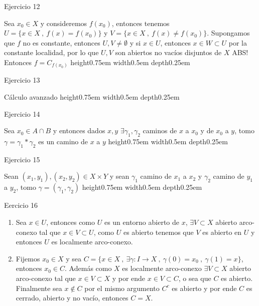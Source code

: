 \documentclass[11pt]{article}
\newcommand{\sette}[2]{\{#1 \ , \ #2 \}}
\newenvironment{proof}[1][Demostraci\'on]{\begin{trivlist}
\item[\hskip \labelsep {\bfseries #1}]}{\end{trivlist}}
\newcommand{\qed}{\nobreak \ifvmode \relax \else
      \ifdim\lastskip<1.5em \hskip-\lastskip
      \hskip1.5em plus0em minus0.5em \fi \nobreak
      \vrule height0.75em width0.5em depth0.25em\fi}
\begin{document}
\begin{enumerate}
\item {Ejercicio 12}

\begin{proof}

Sea $x_0 \in X$ y consideremos $f(x_0)$, entonces tenemos $U = \sette{x \in X}{f(x)=f(x_0)}$ y $V = \sette{x \in X}{f(x) \neq f(x_0)}$. Supongamos que $f$ no es constante, entonces $U,V \neq \emptyset$ y si $x \in U$, entonces $x \in W \subset U$ por la constante localidad, por lo que $U,V$ son abiertos no vac\'ios disjuntos de $X$ ABS! Entonces $f = C_{f(x_0)}$ \qed

\end{proof}

\item {Ejercicio 13}

\begin{proof}
C\'alculo avanzado \qed
\end{proof}

\item {Ejercicio 14}

\begin{proof}

Sea $x_0 \in A \cap B$ y entonces dados $x,y$ $\exists \gamma_1,\gamma_2$ caminos de $x$ a $x_0$ y de $x_0$ a $y$, tomo $\gamma = \gamma_1 * \gamma_2$ es un camino de $x$ a $y$ \qed

\end{proof}

\item {Ejercicio 15}

\begin{proof}

Sean $(x_1,y_1),(x_2,y_2) \in X \times Y$ y sean $\gamma_1$ camino de $x_1$ a $x_2$ y $\gamma_2$ camino de $y_1$ a $y_2$, tomo $\gamma = (\gamma_1 , \gamma_2)$ \qed

\end{proof}

\item {Eercicio 16}

\begin{proof}

\begin{enumerate}

\item Sea $x \in U$, entonces como $U$ es un entorno abierto de $x$, $\exists V \subset X$ abierto arco-conexo tal que $x \in V \subset U$, como $U$ es abierto tenemos que $V$ es abierto en $U$ y entonces $U$ es localmente arco-conexo.

\item Fijemos $x_0 \in X$ y sea $C = \sette{x \in X}{\exists \gamma:I \rightarrow X \ , \ \gamma(0)=x_0 \ , \ \gamma(1)=x}$, entonces $x_0 \in C$. Adem\'as como $X$ es localmente arco-conexo $\exists V \subset X$ abierto arco-conexo tal que $x \in V \subset X$ y por ende $x \in V \subset C$, o sea que $C$ es abierto. Finalmente sea $x \not \in C$ por el mismo argumento $C^{c}$ es abierto y por ende $C$ es cerrado, abierto y no vac\'io, entonces $C = X$.


\end{enumerate}
\end{proof}
\end{enumerate}
\end{document}

